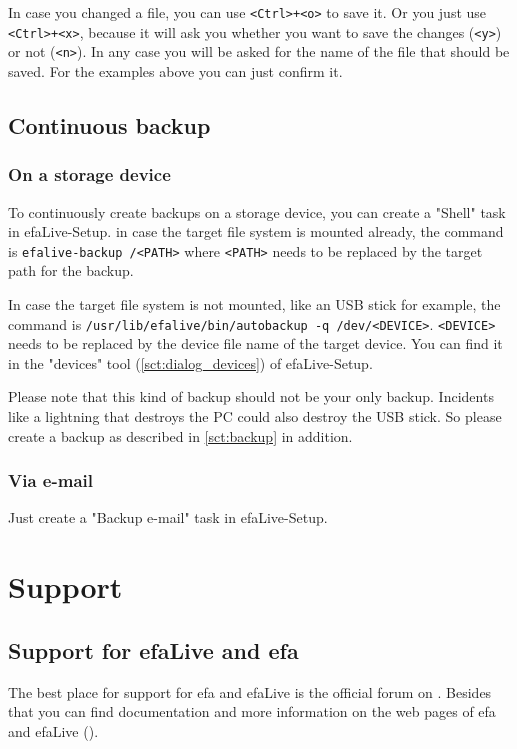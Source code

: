 \documentclass[a4paper,12pt,twoside]{article}
\begin{document}
In case you changed a file, you can use
\texttt{{\textless}Ctrl{\textgreater}+{\textless}o{\textgreater}} to save it. Or
you just use \texttt{{\textless}Ctrl{\textgreater}+{\textless}x{\textgreater}},
because it will ask you whether you want to save the changes
(\texttt{{\textless}y{\textgreater}}) or not (\texttt{{\textless}n{\textgreater}}). In
any case you will be asked for the name of the file that should be
saved. For the examples above you can just confirm it.


\subsection{Continuous backup}
\label{sct:cont_backup}
\subsubsection{On a storage device}
\label{sct:cont_device}
To continuously create backups on a storage device, you can create a "Shell" task
in efaLive-Setup. in case the target file system is mounted already, the command is 
\texttt{efalive-backup /{\textless}PATH{\textgreater}} where 
\texttt{{\textless}PATH{\textgreater}} needs to be replaced by the 
target path for the backup.

In case the target file system is not mounted, like an USB stick for example, the 
command is \texttt{/usr/lib/efalive/bin/autobackup -q /dev/{\textless}DEVICE{\textgreater}}.
\texttt{{\textless}DEVICE{\textgreater}} needs 
to be replaced by the device file name of the target device. You can find it in the 
"devices" tool (\ref{sct:dialog_devices}) of efaLive-Setup.

Please note that this kind of backup should not be your only backup.
Incidents like a lightning that destroys the PC could also destroy the
USB stick. So please create a backup as described in \ref{sct:backup} in addition.

\subsubsection{Via e-mail}
\label{sct:cont_mail}
Just create a "Backup e-mail" task in efaLive-Setup.


\section{Support}
\label{sct:support}
\subsection{Support for efaLive and efa}
\label{sct:support_efa}
The best place for support for efa and efaLive is the official forum on
\cite{EFA3}. Besides that you can find documentation and more
information on the web pages of efa and efaLive
(\cite{EFA1}\cite{EFA4}\cite{EFA5}).
\end{document}
